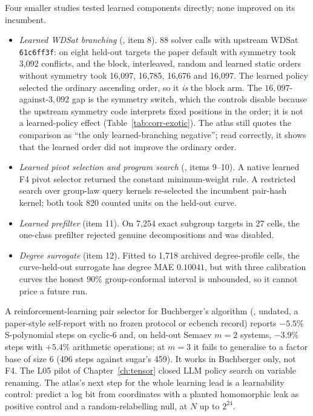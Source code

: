 Four smaller studies tested learned components directly; none improved on
its incumbent.
\begin{itemize}
\item \emph{Learned WDSat branching}
  (, item
  8). 88 solver calls with upstream WDSat \texttt{61c6ff3f}: on eight held-out
  targets the paper default with symmetry took 3{,}092 conflicts, and the
  block, interleaved, random and learned static orders without symmetry took
  16{,}097, 16{,}785, 16{,}676 and 16{,}097. The learned policy selected the
  ordinary ascending order, so it \emph{is} the block arm. The
  $16{,}097$-against-$3{,}092$ gap is the symmetry switch, which the controls
  disable because the upstream symmetry code interprets fixed positions in
  the order; it is not a learned-policy effect
  (Table~\ref{tab:corr-exotic}). The atlas still quotes the comparison as
  ``the only learned-branching negative''; read correctly, it shows that the
  learned order did not improve the ordinary order.
\item \emph{Learned pivot selection and program search}
  (, items 9--10). A
  native learned F4 pivot selector returned the constant minimum-weight
  rule. A restricted search over group-law query kernels re-selected the
  incumbent pair-hash kernel; both took 820 counted units on the held-out
  curve.
\item \emph{Learned prefilter} (item 11). On 7{,}254 exact subgroup
  targets in 27 cells, the one-class prefilter rejected genuine
  decompositions and was disabled.
\item \emph{Degree surrogate} (item 12). Fitted to 1{,}718 archived
  degree-profile cells, the curve-held-out surrogate has degree MAE $0.10041$,
  but with three calibration curves the honest 90\% group-conformal interval
  is unbounded, so it cannot price a future run.
\end{itemize}
A reinforcement-learning pair selector for Buchberger's algorithm
(, undated, a paper-style self-report with no
frozen protocol or ecbench record) reports $-5.5\%$ S-polynomial steps on
cyclic-6 and, on held-out Semaev $m=2$ systems, $-3.9\%$ steps with $+5.4\%$
arithmetic operations; at $m=3$ it fails to generalise to a factor base of
size 6 (496 steps against sugar's 459). It works in Buchberger only, not F4.
The L05 pilot of Chapter~\ref{ch:tensor} closed LLM policy search on variable
renaming. The atlas's next step for the whole learning lead is a
learnability control: predict a log bit from coordinates with a planted
homomorphic leak as positive control and a random-relabelling null, at $N$
up to $2^{24}$.

